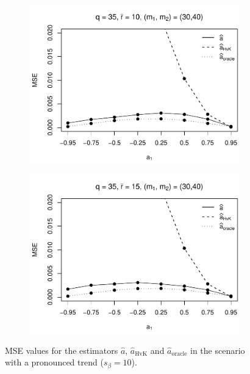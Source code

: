 \begin{figure}[p]
\begin{subfigure}[b]{0.45\textwidth}
\includegraphics[width=\textwidth]{Plots/Robustness/MSE_a1_zoomed_T=500_slope=10_(q,K1,K2,M1,M2)=(35,2,10,30,40).pdf}
\end{subfigure}
\hspace{0.25cm}
\begin{subfigure}[b]{0.45\textwidth}
\includegraphics[width=\textwidth]{Plots/Robustness/MSE_a1_zoomed_T=500_slope=10_(q,K1,K2,M1,M2)=(35,2,15,30,40).pdf}
\end{subfigure}
\caption{MSE values for the estimators $\widehat{a}$, $\widehat{a}_{\text{HvK}}$ and $\widehat{a}_{\text{oracle}}$ in the scenario with a pronounced trend ($s_\beta=10$).}\label{fig:MSE_slope10_AR_zoom_robust}
\end{figure}



